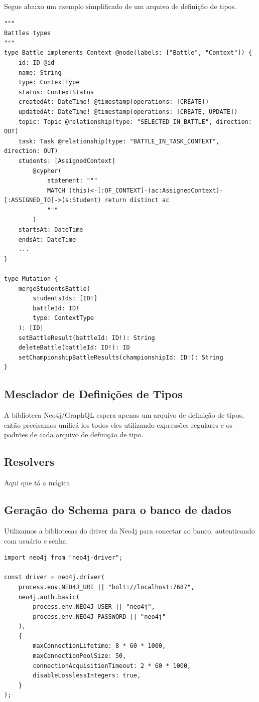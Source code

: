 Segue abaixo um exemplo simplificado de um arquivo de definição de tipos.
\begin{lstlisting}
"""
Battles types
"""
type Battle implements Context @node(labels: ["Battle", "Context"]) {
	id: ID @id
	name: String
	type: ContextType
	status: ContextStatus
	createdAt: DateTime! @timestamp(operations: [CREATE])
	updatedAt: DateTime! @timestamp(operations: [CREATE, UPDATE])
	topic: Topic @relationship(type: "SELECTED_IN_BATTLE", direction: OUT)
	task: Task @relationship(type: "BATTLE_IN_TASK_CONTEXT", direction: OUT)
	students: [AssignedContext]
		@cypher(
			statement: """
			MATCH (this)<-[:OF_CONTEXT]-(ac:AssignedContext)-[:ASSIGNED_TO]->(s:Student) return distinct ac
			"""
		)
	startsAt: DateTime
	endsAt: DateTime
    ...
}

type Mutation {
	mergeStudentsBattle(
		studentsIds: [ID!]
		battleId: ID!
		type: ContextType
	): [ID]
	setBattleResult(battleId: ID!): String
	deleteBattle(battleId: ID!): ID
	setChampionshipBattleResults(championshipId: ID!): String
}
\end{lstlisting}

\subsection{Mesclador de Definições de Tipos}
A biblioteca Neo4j/GraphQL espera apenas um arquivo de definição de tipos, então precisamos unificá-los todos eles utilizando expressões regulares e os padrões de cada arquivo de definição de tipo.

\subsection{Resolvers}

Aqui que tá a mágica 

\subsection{Geração do Schema para o banco de dados}

 Utilizamos a bibliotecas do driver da Neo4j para conectar ao banco, autenticando com usuário e senha.
 
 \begin{lstlisting}
import neo4j from "neo4j-driver";

const driver = neo4j.driver(
	process.env.NEO4J_URI || "bolt://localhost:7687",
	neo4j.auth.basic(
		process.env.NEO4J_USER || "neo4j",
		process.env.NEO4J_PASSWORD || "neo4j"
	),
	{
		maxConnectionLifetime: 8 * 60 * 1000,
		maxConnectionPoolSize: 50,
		connectionAcquisitionTimeout: 2 * 60 * 1000,
		disableLosslessIntegers: true,
	}
);
\end{lstlisting}


